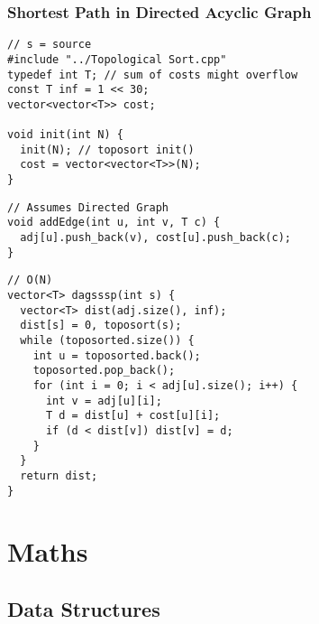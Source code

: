 \documentclass[twoside]{article}
\newcommand{\fileTitleStyle}{\large\underline}
\begin{document}
\begin{multicols*}{2}
\subsubsectionfont{\centering\bfseries\Large}
\subsubsectionfont{\fileTitleStyle}
\subsubsection*{Shortest Path in Directed Acyclic Graph}
\begin{verbatim}
// s = source
#include "../Topological Sort.cpp"
typedef int T; // sum of costs might overflow
const T inf = 1 << 30;
vector<vector<T>> cost;

void init(int N) {
  init(N); // toposort init()
  cost = vector<vector<T>>(N);
}
\end{verbatim}
\vspace{-12pt}
\begin{verbatim}
// Assumes Directed Graph
void addEdge(int u, int v, T c) {
  adj[u].push_back(v), cost[u].push_back(c);
}
\end{verbatim}
\vspace{-12pt}
\begin{verbatim}
// O(N)
vector<T> dagsssp(int s) {
  vector<T> dist(adj.size(), inf);
  dist[s] = 0, toposort(s);
  while (toposorted.size()) {
    int u = toposorted.back();
    toposorted.pop_back();
    for (int i = 0; i < adj[u].size(); i++) {
      int v = adj[u][i];
      T d = dist[u] + cost[u][i];
      if (d < dist[v]) dist[v] = d;
    }
  }
  return dist;
}
\end{verbatim}

\sectionfont{\centering\bfseries\Huge}
\vspace{1em}
\section*{Maths}
\vspace{3em}
\subsectionfont{\centering\bfseries\LARGE}
\vspace{0em}
\subsection*{Data Structures}
\vspace{2em}
\subsubsectionfont{\centering\bfseries\Large}
\subsubsectionfont{\fileTitleStyle}

\end{multicols*}
\end{document}
